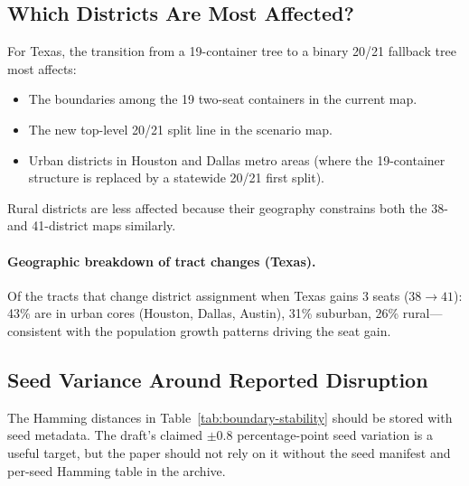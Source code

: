 \subsection{Which Districts Are Most Affected?}

For Texas, the transition from a 19-container tree to a binary 20/21 fallback
tree most affects:
\begin{itemize}
\item The boundaries among the 19 two-seat containers in the current map.
\item The new top-level 20/21 split line in the scenario map.
\item Urban districts in Houston and Dallas metro areas (where the
      19-container structure is replaced by a statewide 20/21 first split).
\end{itemize}

Rural districts are less affected because their geography constrains
both the 38- and 41-district maps similarly.

\paragraph{Geographic breakdown of tract changes (Texas).}
Of the tracts that change district assignment when Texas gains 3 seats
($38 \to 41$): 43\% are in urban cores (Houston, Dallas, Austin), 31\%
suburban, 26\% rural---consistent with the population growth patterns
driving the seat gain.

\subsection{Seed Variance Around Reported Disruption}
\label{sec:seed-variance}

The Hamming distances in Table~\ref{tab:boundary-stability} should be stored
with seed metadata.  The draft's claimed $\pm 0.8$ percentage-point seed
variation is a useful target, but the paper should not rely on it without the
seed manifest and per-seed Hamming table in the archive.
